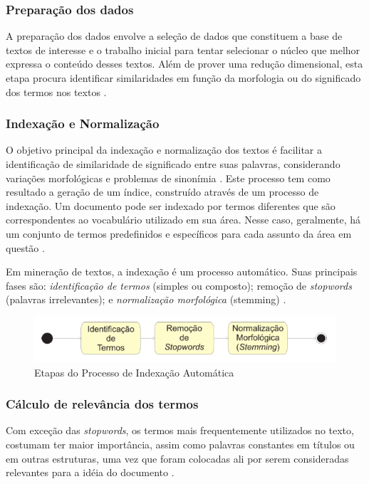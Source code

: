 \subsubsection{Preparação dos dados}
A preparação dos dados envolve a seleção de dados que constituem a base de textos de interesse e o trabalho inicial para tentar selecionar o núcleo que melhor expressa o conteúdo desses textos. Além de prover uma redução dimensional, esta etapa procura identificar similaridades em função da morfologia ou do significado dos termos nos textos \cite{morais2007mineraccao}.

\subsubsection{Indexação e Normalização}
O objetivo principal da indexação e normalização dos textos é facilitar a identificação de similaridade de significado entre suas palavras, considerando variações morfológicas e problemas de sinonímia \cite{morais2007mineraccao}. Este processo tem como resultado a geração de um índice, construído através de um processo de indexação. Um documento pode ser indexado por termos diferentes que são correspondentes ao vocabulário utilizado em sua área. Nesse caso, geralmente, há um conjunto de termos predefinidos e específicos para cada assunto da área em questão .

Em mineração de textos, a indexação é um processo automático. Suas principais fases são: \textit{identificação de termos} (simples ou composto); remoção de \textit{stopwords} (palavras irrelevantes); e \textit{normalização morfológica} (stemming) \cite{morais2007mineraccao}.

\begin{figure}[H] %
	\caption{\label{fig:figura-4} Etapas do Processo de Indexação Automática}
	\begin{center}
	    \includegraphics[scale=0.8]{figuras/figura_4.PNG} %
	\end{center}
\end{figure}

\subsubsection{Cálculo de relevância dos termos}
Com exceção das \textit{stopwords}, os termos mais frequentemente utilizados no texto, costumam ter maior importância, assim como palavras constantes em títulos ou em outras estruturas, uma vez que foram colocadas ali por serem consideradas relevantes para a idéia do documento \cite{morais2007mineraccao}.

